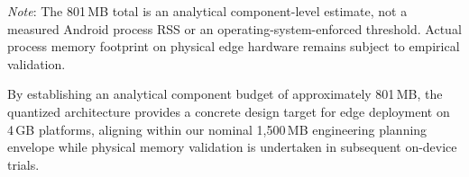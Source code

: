 \begin{table}[htbp]
\centering
\caption[Analytical Memory Budget for Proposed Quantized IndicF5 Deployment]{Analytical Memory Budget for the Proposed Quantized IndicF5 Deployment on 4\,GB Android Hardware}
\label{tab:ram_budget_comparison}
\vspace{0.6ex}
\begin{minipage}{\textwidth}
\footnotesize
\textit{Note}: The 801\,MB total is an analytical component-level estimate, not a measured Android process RSS or an operating-system-enforced threshold. Actual process memory footprint on physical edge hardware remains subject to empirical validation.
\end{minipage}
\end{table}

By establishing an analytical component budget of approximately 801\,MB, the quantized architecture provides a concrete design target for edge deployment on 4\,GB platforms, aligning within our nominal 1,500\,MB engineering planning envelope while physical memory validation is undertaken in subsequent on-device trials.

